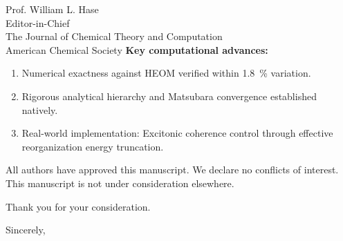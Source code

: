 \documentclass[11pt,a4paper]{letter}
\begin{document}
\begin{letter}{
Prof. William L. Hase \\
Editor-in-Chief\\
The Journal of Chemical Theory and Computation\\
American Chemical Society
}
\textbf{Key computational advances:}
\begin{enumerate}
\item Numerical exactness against HEOM verified within \SI{1.8}{\percent} variation.
\item Rigorous analytical hierarchy and Matsubara convergence established natively.
\item Real-world implementation: Excitonic coherence control through effective reorganization energy truncation.
\end{enumerate}

All authors have approved this manuscript. We declare no conflicts of interest. This manuscript is not under consideration elsewhere.

Thank you for your consideration.

\closing{Sincerely,}


\end{letter}
\end{document}
